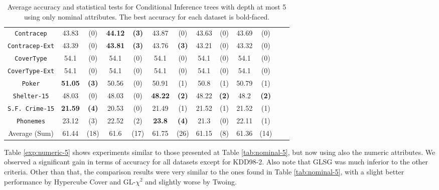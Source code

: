 \begin{table*}
\begin{tabular}{c|cc|cc|cc|cc|cc|cc}
{\tt Contracep}    &43.83       & (0)       & {\bf 44.12} & {\bf (3)} & 43.87       & (0)       & 43.63       & (0)       & 43.69       & (0)         &             &             \\
{\tt Contracep-Ext}&43.39       & (0)       & {\bf 43.81} & {\bf (3)} & 43.76       & {\bf (3)} & 43.21       & (0)       & 43.32       & (0)         &             &             \\
{\tt CoverType}    &54.1        & (0)       & 54.1        & (0)       & 54.1        & (0)       & 54.1        & (0)       & 54.1        & (0)         &             &             \\
{\tt CoverType-Ext}&54.1        & (0)       & 54.1        & (0)       & 54.1        & (0)       & 54.1        & (0)       & 54.1        & (0)         &             &             \\
{\tt Poker}        &{\bf 51.05} & {\bf (3)} & 50.56       & (0)       & 50.91       & (1)       & 50.8        & (1)       & 50.79       & (1)         &             &             \\  
{\tt Shelter-15}   & 48.03      & (0)       & 48.03       & (0)       & {\bf 48.22} & {\bf (2)} & 48.22       & {\bf (2)} & 48.2        & {\bf (2)}   &             &             \\   
{\tt S.F. Crime-15}&{\bf 21.59} & {\bf (4)} & 20.53       & (0)       & 21.49       & (1)       & 21.52       & (1)       & 21.52       & (1)         &             &             \\ 
{\tt Phonemes}     & 23.12      & (3)       & 22.52       & (2)       & {\bf 23.8 } & {\bf (4)} & 21.3        & (0)       & 22.11       & (1)         &             &             \\ 
\hline
Average (Sum)      & 61.44      & (18)      & 61.6        & (17)      & 61.75       & (26)      & 61.15       & (8)       & 61.36       & (14)        &             &
       \end{tabular}
    \caption{Average accuracy and statistical tests  for  Conditional Inference trees 
with depth at most 5 using only nominal attributes. The best accuracy for each dataset is bold-faced.}
\label{tab:ctree-5}
\end{table*}


Table \ref{exp:numeric-5} shows experiments  similar to those presented at Table \ref{tab:nominal-5}, but now using also the numeric attributes. We observed a significant gain in terms of accuracy for all datasets except for KDD98-2. Also note that GLSG was much inferior to the other criteria. Other than that, the comparison results were very similar to the ones found in Table \ref{tab:nominal-5}, with a slight better performance by Hypercube Cover and GL-$\chi^2$ and slightly worse by Twoing.

